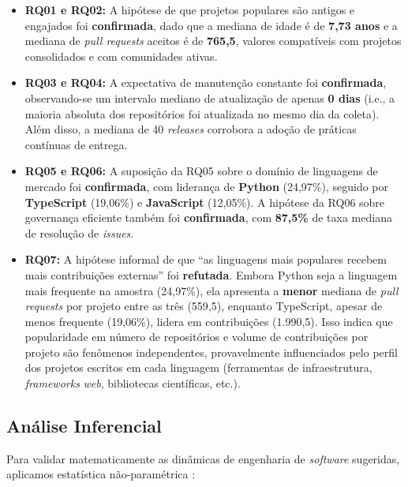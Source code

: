 \documentclass[
	article,			%
	11pt,				%
	oneside,			%
	a4paper,			%
	english,			%
	brazil,				%
	sumario=tradicional
	]{abntex2}
\begin{document}
\begin{itemize}
    \item \textbf{RQ01 e RQ02:} A hipótese de que projetos populares são antigos e engajados foi \textbf{confirmada}, dado que a mediana de idade é de \textbf{7,73 anos} e a mediana de \textit{pull requests} aceitos é de \textbf{765,5}, valores compatíveis com projetos consolidados e com comunidades ativas.
    \item \textbf{RQ03 e RQ04:} A expectativa de manutenção constante foi \textbf{confirmada}, observando-se um intervalo mediano de atualização de apenas \textbf{0 dias} (i.e., a maioria absoluta dos repositórios foi atualizada no mesmo dia da coleta). Além disso, a mediana de 40 \textit{releases} corrobora a adoção de práticas contínuas de entrega.
    \item \textbf{RQ05 e RQ06:} A suposição da RQ05 sobre o domínio de linguagens de mercado foi \textbf{confirmada}, com liderança de \textbf{Python} (24,97\%), seguido por \textbf{TypeScript} (19,06\%) e \textbf{JavaScript} (12,05\%). A hipótese da RQ06 sobre governança eficiente também foi \textbf{confirmada}, com \textbf{87,5\%} de taxa mediana de resolução de \textit{issues}.
    \item \textbf{RQ07:} A hipótese informal de que ``as linguagens mais populares recebem mais contribuições externas'' foi \textbf{refutada}. Embora Python seja a linguagem mais frequente na amostra (24,97\%), ela apresenta a \textbf{menor} mediana de \textit{pull requests} por projeto entre as três (559,5), enquanto TypeScript, apesar de menos frequente (19,06\%), lidera em contribuições (1.990,5). Isso indica que popularidade em número de repositórios e volume de contribuições por projeto são fenômenos independentes, provavelmente influenciados pelo perfil dos projetos escritos em cada linguagem (ferramentas de infraestrutura, \textit{frameworks} \textit{web}, bibliotecas científicas, etc.).
\end{itemize}

\subsection{Análise Inferencial}
Para validar matematicamente as dinâmicas de engenharia de \textit{software} sugeridas, aplicamos estatística não-paramétrica \cite{borges2016understanding}:
\end{document}
